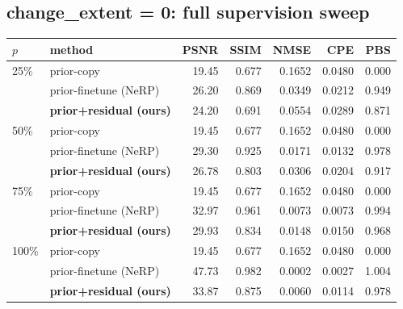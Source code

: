 \documentclass[11pt]{article}
\begin{document}
\subsection*{change\_extent = 0: full supervision sweep}
\begin{table}[H]\centering\begin{tabular}{llrrrrr}\toprule
$p$ & method & PSNR & SSIM & NMSE & CPE & PBS \\ \midrule
25\% & prior-copy & 19.45 & 0.677 & 0.1652 & 0.0480 & 0.000 \\
 & prior-finetune (NeRP) & 26.20 & 0.869 & 0.0349 & 0.0212 & 0.949 \\
 & \textbf{prior+residual (ours)} & 24.20 & 0.691 & 0.0554 & 0.0289 & 0.871 \\
\midrule
50\% & prior-copy & 19.45 & 0.677 & 0.1652 & 0.0480 & 0.000 \\
 & prior-finetune (NeRP) & 29.30 & 0.925 & 0.0171 & 0.0132 & 0.978 \\
 & \textbf{prior+residual (ours)} & 26.78 & 0.803 & 0.0306 & 0.0204 & 0.917 \\
\midrule
75\% & prior-copy & 19.45 & 0.677 & 0.1652 & 0.0480 & 0.000 \\
 & prior-finetune (NeRP) & 32.97 & 0.961 & 0.0073 & 0.0073 & 0.994 \\
 & \textbf{prior+residual (ours)} & 29.93 & 0.834 & 0.0148 & 0.0150 & 0.968 \\
\midrule
100\% & prior-copy & 19.45 & 0.677 & 0.1652 & 0.0480 & 0.000 \\
 & prior-finetune (NeRP) & 47.73 & 0.982 & 0.0002 & 0.0027 & 1.004 \\
 & \textbf{prior+residual (ours)} & 33.87 & 0.875 & 0.0060 & 0.0114 & 0.978 \\

\bottomrule\end{tabular}
\end{table}
\end{document}

